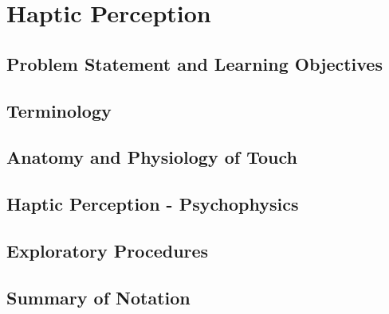 %

\chapter{Haptic Perception}

\section{Problem Statement and Learning Objectives}



\section{Terminology}
\section{Anatomy and Physiology of Touch}
\section{Haptic Perception - Psychophysics}
\section{Exploratory Procedures}


\section{Summary of Notation}


